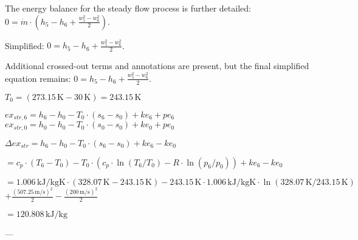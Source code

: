 The energy balance for the steady flow process is further detailed:  
\( 0 = \dot{m} \cdot (h_5 - h_6 + \frac{w_5^2 - w_6^2}{2}) \).  

Simplified:  
\( 0 = h_5 - h_6 + \frac{w_5^2 - w_6^2}{2} \).  

Additional crossed-out terms and annotations are present, but the final simplified equation remains:  
\( 0 = h_5 - h_6 + \frac{w_5^2 - w_6^2}{2} \).

\( T_0 = (273.15 \, \text{K} - 30 \, \text{K}) = 243.15 \, \text{K} \)  

\( ex_{str,6} = h_6 - h_0 - T_0 \cdot (s_6 - s_0) + ke_6 + pe_6 \)  
\( ex_{str,0} = h_0 - h_0 - T_0 \cdot (s_0 - s_0) + ke_0 + pe_0 \)  

\( \Delta ex_{str} = h_6 - h_0 - T_0 \cdot (s_6 - s_0) + ke_6 - ke_0 \)  

\( = c_p \cdot (T_6 - T_0) - T_0 \cdot (c_p \cdot \ln(T_6/T_0) - R \cdot \ln(p_6/p_0)) + ke_6 - ke_0 \)  

\( = 1.006 \, \text{kJ}/\text{kgK} \cdot (328.07 \, \text{K} - 243.15 \, \text{K}) - 243.15 \, \text{K} \cdot 1.006 \, \text{kJ}/\text{kgK} \cdot \ln(328.07 \, \text{K}/243.15 \, \text{K}) \)  
\( + \frac{(507.25 \, \text{m}/\text{s})^2}{2} - \frac{(200 \, \text{m}/\text{s})^2}{2} \)  

\( = 120.808 \, \text{kJ}/\text{kg} \)  

---